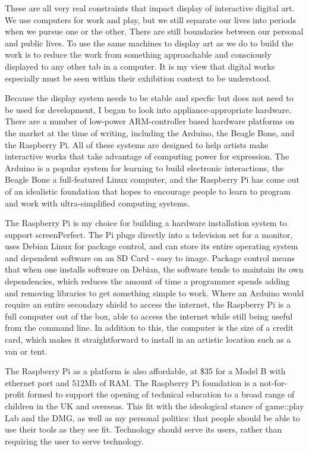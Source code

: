 These are all very real constraints that impact display of interactive digital art. We use computers for work and play, but we still separate our lives into periods when we pursue one or the other. There are still boundaries between our personal and public lives. To use the same machines to display art as we do to build the work is to reduce the work from something approachable and consciously displayed to any other tab in a computer. It is my view that digital works especially must be seen within their exhibition context to be understood.

Because the display system needs to be stable and specfic but does not need to be used for development, I began to look into appliance-appropriate hardware. There are a number of low-power ARM-controller based hardware platforms on the market at the time of writing, including the Arduino, the Beagle Bone, and the Raspberry Pi. All of these systems are designed to help artists make interactive works that take advantage of computing power for expression. The Arduino is a popular system for learning to build electronic interactions, the Beagle Bone a full-featured Linux computer, and the Raspberry Pi has come out of an idealistic foundation that hopes to encourage people to learn to program and work with ultra-simplified computing systems.

The Raspberry Pi is my choice for building a hardware installation system to support screenPerfect. The Pi plugs directly into a television set for a monitor, uses Debian Linux for package control, and can store its entire operating system and dependent software on an SD Card - easy to image. Package control means that when one installs software on Debian, the software tends to maintain its own dependencies, which reduces the amount of time a programmer spends adding and removing libraries to get something simple to work. Where an Arduino would require an entire secondary shield to access the internet, the Raspberry Pi is a full computer out of the box, able to access the internet while still being useful from the command line. In addition to this, the computer is the size of a credit card, which makes it straightforward to install in an artistic location such as a van or tent. 

The Raspberry Pi as a platform is also affordable, at \$35 for a Model B with ethernet port and 512Mb of RAM. The Raspberry Pi foundation is a not-for-profit formed to support the opening of technical education to a broad range of children in the UK and overseas. This fit with the ideological stance of game::play Lab and the DMG, as well as my personal politics: that people should be able to use their tools as they see fit. Technology should serve its users, rather than requiring the user to serve technology.

